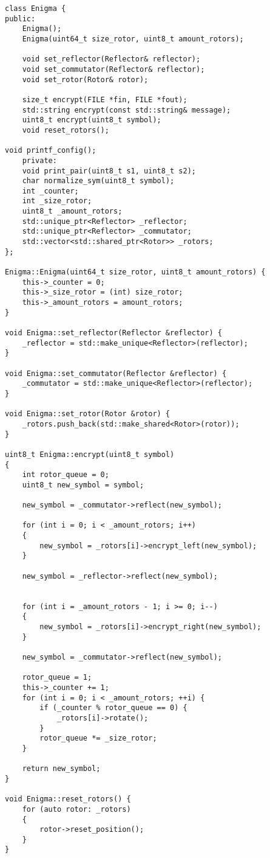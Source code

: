 \begin{lstlisting}[label=lst:enigma:reflactor,caption=Класс енигмы]
class Enigma {
public:
	Enigma();
	Enigma(uint64_t size_rotor, uint8_t amount_rotors);
	
	void set_reflector(Reflector& reflector);
	void set_commutator(Reflector& reflector);
	void set_rotor(Rotor& rotor);
	
	size_t encrypt(FILE *fin, FILE *fout);
	std::string encrypt(const std::string& message);
	uint8_t encrypt(uint8_t symbol);
	void reset_rotors();
	
void printf_config();
	private:
	void print_pair(uint8_t s1, uint8_t s2);
	char normalize_sym(uint8_t symbol);
	int _counter;
	int _size_rotor;
	uint8_t _amount_rotors;
	std::unique_ptr<Reflector> _reflector;
	std::unique_ptr<Reflector> _commutator;
	std::vector<std::shared_ptr<Rotor>> _rotors;
};

Enigma::Enigma(uint64_t size_rotor, uint8_t amount_rotors) {
	this->_counter = 0;
	this->_size_rotor = (int) size_rotor;
	this->_amount_rotors = amount_rotors;
}

void Enigma::set_reflector(Reflector &reflector) {
	_reflector = std::make_unique<Reflector>(reflector);
}

void Enigma::set_commutator(Reflector &reflector) {
	_commutator = std::make_unique<Reflector>(reflector);
}

void Enigma::set_rotor(Rotor &rotor) {
	_rotors.push_back(std::make_shared<Rotor>(rotor));
}

uint8_t Enigma::encrypt(uint8_t symbol)
{
	int rotor_queue = 0;
	uint8_t new_symbol = symbol;
	
	new_symbol = _commutator->reflect(new_symbol);
	
	for (int i = 0; i < _amount_rotors; i++)
	{
		new_symbol = _rotors[i]->encrypt_left(new_symbol);
	}
	
	new_symbol = _reflector->reflect(new_symbol);
	

	for (int i = _amount_rotors - 1; i >= 0; i--)
	{
		new_symbol = _rotors[i]->encrypt_right(new_symbol);
	}
	
	new_symbol = _commutator->reflect(new_symbol);
	
	rotor_queue = 1;
	this->_counter += 1;
	for (int i = 0; i < _amount_rotors; ++i) {
		if (_counter % rotor_queue == 0) {
			_rotors[i]->rotate();
		}
		rotor_queue *= _size_rotor;
	}
	
	return new_symbol;
}

void Enigma::reset_rotors() {
	for (auto rotor: _rotors)
	{
		rotor->reset_position();
	}
}


\end{lstlisting}
